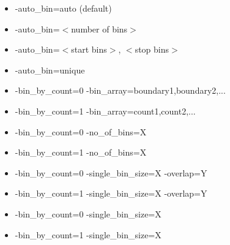 \begin{itemize}
	\item -auto\_bin=auto   (default)
	\item -auto\_bin=$<$number of bins$>$
	\item -auto\_bin=$<$start bins$>$, $<$stop bins$>$
	\item -auto\_bin=unique
	\item -bin\_by\_count=0 -bin\_array=boundary1,boundary2,...
	\item -bin\_by\_count=1 -bin\_array=count1,count2,...
	\item -bin\_by\_count=0 -no\_of\_bins=X
	\item -bin\_by\_count=1 -no\_of\_bins=X
	\item -bin\_by\_count=0 -single\_bin\_size=X -overlap=Y
	\item -bin\_by\_count=1 -single\_bin\_size=X -overlap=Y
	\item -bin\_by\_count=0 -single\_bin\_size=X
	\item -bin\_by\_count=1 -single\_bin\_size=X
\end{itemize}
